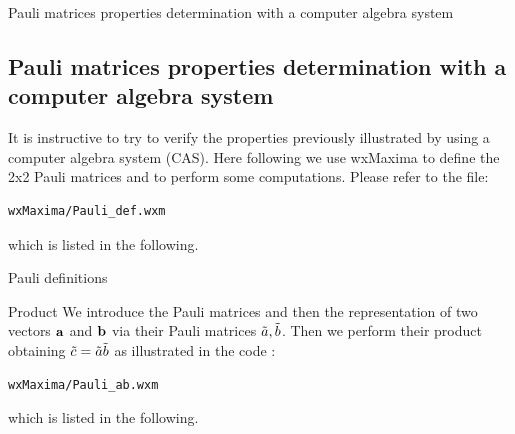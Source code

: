 \documentclass[10pt]{beamer}
\begin{document}
\begin{frame}[fragile]{Pauli matrices properties determination  with a computer algebra system}
%
\subsection{Pauli matrices properties determination  with a computer algebra system }

It is instructive to try to verify the properties previously illustrated by using a computer algebra system (CAS). Here following we use wxMaxima to define the 2x2 Pauli matrices and to perform some computations.
Please refer to the file:
\small
\begin{verbatim}
wxMaxima/Pauli_def.wxm
\end{verbatim}
\normalsize
%
which is listed in the following.



\end{frame}
\begin{frame}[shrink=70]{Pauli definitions}
%
\small

\normalsize
\end{frame}
\begin{frame}[fragile]{Product }
%
We introduce the Pauli matrices and then the representation of two vectors $\mathbf{a}$ and $\mathbf{b}$ via their Pauli matrices $\tilde{a},\tilde{b}$. Then we perform their product obtaining $\tilde{c}= \tilde{a} \tilde{b}$ as illustrated in the code :
%
\small
\begin{verbatim}
wxMaxima/Pauli_ab.wxm
\end{verbatim}
\normalsize
%
which is listed in the following.
\end{frame}

\begin{frame}[shrink=70]{}
%
\small

\normalsize
\end{frame}
\end{document}
